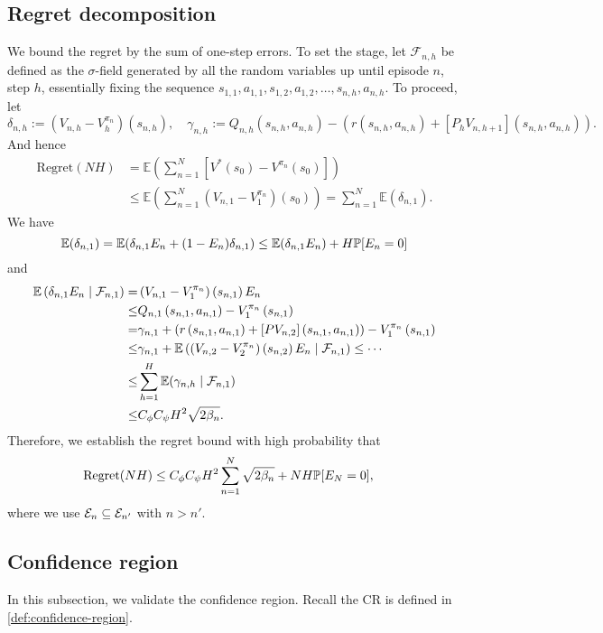 \subsection{Regret decomposition}
We bound the regret by the sum of one-step errors. To set the stage, let
$\mathcal{F}_{n,h}$ be defined as the $\sigma$-field generated by all the random variables up until episode $n$, step $h$, essentially fixing the sequence $s_{1,1}, a_{1,1}, s_{1,2}, a_{1,2}, \ldots, s_{n,h}, a_{n,h}$. 
To proceed, let 
\[\delta_{n,h} := (V_{n,h}-V_{h}^{\pi_{n}})(s_{n,h}), \quad
\gamma_{n,h}:= Q_{n,h}(s_{n,h},a_{n,h}) - \left(r(s_{n,h},a_{n,h}) + [P_h V_{n,h+1}](s_{n,h},a_{n,h})\right).\]
And hence
\begin{align*}
\text{Regret}(NH) &= \mathbb{E}\left(\sum_{n=1}^{N} \left[ V^*(s_0) - V^{\pi_n}(s_0) \right]\right) 
\\
&\leq \mathbb{E}\left( \sum_{n=1}^{N}(V_{n,1}-V_{1}^{\pi_{n}})(s_0)\right) = \sum_{n=1}^{N}\mathbb{E}(\delta_{n,1}).
\end{align*}
We have
\[\mathbb{E}(\delta_{n,1}) = \mathbb{E}(\delta_{n,1}E_n+(1-E_n)\delta_{n,1}) 
\le\mathbb{E}(\delta_{n,1}E_n)+H\mathbb{P}[E_n=0]\]
and
\begin{align*}
\mathbb{E}\left( \delta_{n,1}E_n \mid \mathcal{F}_{n,1} \right) =& \left( V_{n,1} - V_{1}^{\pi_{n}} \right)\left( s_{n,1} \right)E_n \\
\leq &Q_{n,1}\left( s_{n,1},a_{n,1} \right) - V_{1}^{\pi_{n}}\left( s_{n,1} \right) \\
= &\gamma_{n,1} + \left( r\left( s_{n,1},a_{n,1} \right) +[PV_{n,2}]\left( s_{n,1},a_{n,1} \right) \right) -V_{1}^{\pi_{n}}\left( s_{n,1} \right) \\
\leq &\gamma_{n,1} + \mathbb{E}\left( \left( V_{n,2} - V_{2}^{\pi_{n}} \right)\left( s_{n,2} \right)E_n \mid \mathcal{F}_{n,1} \right) 
\leq \cdots\\\leq &\sum_{h=1}^{H}\mathbb{E}(\gamma_{n,h}\mid \mathcal{F}_{n,1})\\
\leq &C_{\phi}C_{\psi}H^2\sqrt{2\beta_n}.
\end{align*}
Therefore, we establish the regret bound with high probability that
\begin{align}
\label{equ:regret-intermediate}
\text{Regret}
(NH) &\leq C_{\phi}C_{\psi}H^2\sum_{n=1}^N\sqrt{2\beta_n}+NH\mathbb{P}[E_N=0],
\end{align}
where we use ${\cal E}_n\subseteq {\cal E}_{n'}$ with $n>n'$.

\subsection{Confidence region}
In this subsection, we validate the confidence region. Recall the CR is defined in \eqref{def:confidence-region}.

